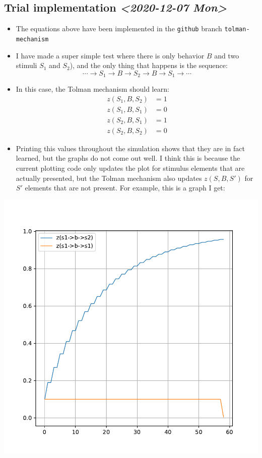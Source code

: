 \documentclass[11pt]{article}
\begin{document}
\subsection{Trial implementation \textit{<2020-12-07 Mon>}}
\label{sec:org81cc5f6}

\begin{itemize}
\item The equations above have been implemented in the \texttt{github} branch
\texttt{tolman-mechanism}

\item I have made a super simple test where there is only behavior \(B\) and
two stimuli \(S_1\) and \(S_2\)), and the only thing that happens is the
sequence:
\begin{equation}
  \label{eq:simple-test}
  \cdots \to S_1 \to B \to S_2 \to B \to S_1 \to \cdots
\end{equation}

\item In this case, the Tolman mechanism should learn:
\begin{align}
  \label{eq:simple-test-z}
  z(S_1,B,S_2) &= 1\\
  z(S_1,B,S_1) &= 0\\
  z(S_2,B,S_1) &= 1\\
  z(S_2,B,S_2) &= 0
\end{align}

\item Printing this values throughout the simulation shows that they are
in fact learned, but the graphs do not come out well. I think this
is because the current plotting code only updates the plot for
stimulus elements that are actually presented, but the Tolman
mechanism also updates \(z(S,B,S')\) for \(S'\) elements that are not
present. For example, this is a graph I get:
\end{itemize}
\begin{center}
\includegraphics[width=.5\textwidth]{./first-try.pdf}
\end{center}
\end{document}

